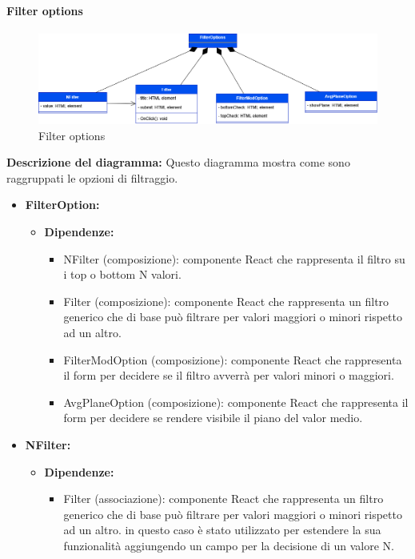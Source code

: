 \paragraph{Filter options}
\begin{figure}[h!] \centering
    \includegraphics[scale=0.45]{template/images/uml_front/ui/filteroptions.png}
    \caption{Filter options}
\end{figure}
\textbf{Descrizione del diagramma:}
Questo diagramma mostra come sono raggruppati le opzioni di filtraggio.
\begin{itemize}
    \item \textbf{FilterOption:}
    \begin{itemize}
        \item \textbf{Dipendenze:}
        \begin{itemize}
            \item NFilter (composizione): componente React che rappresenta il filtro su i top o bottom N valori.
            \item Filter (composizione): componente React che rappresenta un filtro generico che di base può filtrare per valori maggiori o minori rispetto ad un altro.
            \item FilterModOption (composizione): componente React che rappresenta il form per decidere se il filtro avverrà per valori minori o maggiori.
            \item AvgPlaneOption (composizione): componente React che rappresenta il form per decidere se rendere visibile il piano del valor medio.
        \end{itemize} 
    \end{itemize}

    \item \textbf{NFilter:}
    \begin{itemize}
        \item \textbf{Dipendenze:}
        \begin{itemize}
            \item Filter (associazione): componente React che rappresenta un filtro generico che di base può filtrare per valori maggiori o minori rispetto ad un altro.
            in questo caso è stato utilizzato per estendere la sua funzionalità aggiungendo un campo per la decisione di un valore N.
        \end{itemize} 
    \end{itemize}
\end{itemize}

